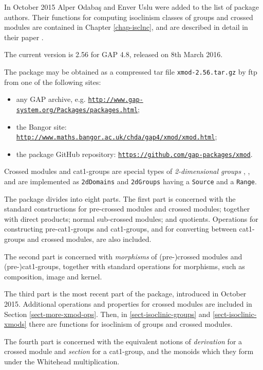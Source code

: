 \documentclass[a4paper,11pt]{report}
\begin{document}
{ In October 2015 Alper Odaba{\c s} and Enver Uslu were added to the list of
package authors. Their functions for computing isoclinism classes of groups
and crossed modules are contained in Chapter \ref{chap-isclnc}, and are described in detail in their paper \cite{IOU1}. 

 The current version is 2.56 for \textsf{GAP} 4.8, released on 8th March 2016. 

 The package may be obtained as a compressed tar file \texttt{xmod-2.56.tar.gz} by ftp from one of the following sites: 
\begin{itemize}
\item  any \textsf{GAP} archive, e.g. \href{http://www.gap-system.org/Packages/packages.html} {\texttt{http://www.gap-system.org/Packages/packages.html}}; 
\item  the Bangor site: \href{http://www.maths.bangor.ac.uk/chda/gap4/xmod/xmod.html} {\texttt{http://www.maths.bangor.ac.uk/chda/gap4/xmod/xmod.html}}; 
\item  the package GitHub repository: \href{https://github.com/gap-packages/xmod} {\texttt{https://github.com/gap-packages/xmod}}. 
\end{itemize}
 

 Crossed modules and cat1-groups are special types of \emph{2-dimensional groups} \cite{B82}, \cite{brow:hig:siv}, and are implemented as \texttt{2dDomains} and \texttt{2dGroups} having a \texttt{Source} and a \texttt{Range}.   

 The package divides into eight parts. The first part is concerned with the
standard constructions for pre-crossed modules and crossed modules; together
with direct products; normal sub-crossed modules; and quotients. Operations
for constructing pre-cat1-groups and cat1-groups, and for converting between
cat1-groups and crossed modules, are also included. 

 The second part is concerned with \emph{morphisms} of (pre-)crossed modules and (pre-)cat1-groups, together with standard
operations for morphisms, such as composition, image and kernel. 

 The third part is the most recent part of the package, introduced in October
2015. Additional operations and properties for crossed modules are included in
Section \ref{sect-more-xmod-ops}. Then, in \ref{sect-isoclinic-groups} and \ref{sect-isoclinic-xmods} there are functions for isoclinism of groups and crossed modules. 

 The fourth part is concerned with the equivalent notions of \emph{derivation} for a crossed module and \emph{section} for a cat1-group, and the monoids which they form under the Whitehead
multiplication. 

}
\end{document}
